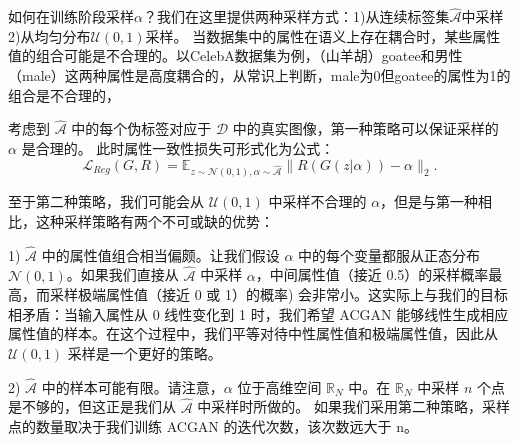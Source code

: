 如何在训练阶段采样$\alpha$？我们在这里提供两种采样方式：1)从连续标签集$\hat{\mathcal{A}}$中采样 2)从均匀分布$\mathcal{U}(0,1)$采样。
当数据集中的属性在语义上存在耦合时，某些属性值的组合可能是不合理的。以CelebA数据集为例，（山羊胡）goatee和男性（male）这两种属性是高度耦合的，从常识上判断，male为0但goatee的属性为1的组合是不合理的，

考虑到 $\hat{\mathcal{A}}$ 中的每个伪标签对应于 $\mathcal{D}$ 中的真实图像，第一种策略可以保证采样的 $\alpha$ 是合理的。
此时属性一致性损失可形式化为公式：
\begin{equation}
   \mathcal{L}_{Reg}(G, R)  =  \mathbb{E}_{z \sim \mathcal{N}(0,1), \alpha \sim \hat{\mathcal{A}}}\|R(G(z|\alpha)) - \alpha\|_2.
\end{equation}

至于第二种策略，我们可能会从 $\mathcal{U}(0,1)$ 中采样不合理的 $\alpha$，但是与第一种相比，这种采样策略有两个不可或缺的优势：

1) $\hat{\mathcal{A}}$ 中的属性值组合相当偏颇。让我们假设 $\alpha$ 中的每个变量都服从正态分布 $\mathcal{N}(0,1)$。如果我们直接从 $\hat{\mathcal{A}}$ 中采样 $\alpha$，中间属性值（接近 0.5）的采样概率最高，而采样极端属性值（接近 0 或 1）的概率) 会非常小。这实际上与我们的目标相矛盾：当输入属性从 0 线性变化到 1 时，我们希望 ACGAN 能够线性生成相应属性值的样本。在这个过程中，我们平等对待中性属性值和极端属性值，因此从 $\mathcal{U}(0,1)$ 采样是一个更好的策略。

2) $\hat{\mathcal{A}}$ 中的样本可能有限。请注意，$\alpha$ 位于高维空间 $\mathbb{R}_N$ 中。在 $\mathbb{R}_N$ 中采样 $n$ 个点是不够的，但这正是我们从 $\hat{\mathcal{A}}$ 中采样时所做的。
如果我们采用第二种策略，采样点的数量取决于我们训练 ACGAN 的迭代次数，该次数远大于 n。

